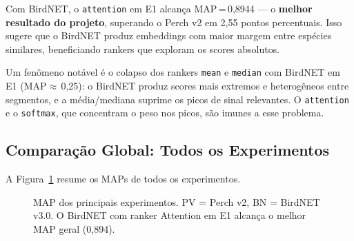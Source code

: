 \documentclass[12pt,a4paper]{article}
\begin{document}
Com BirdNET, o \texttt{attention} em E1 alcança MAP\,=\,0,8944 --- o
\textbf{melhor resultado do projeto}, superando o Perch v2 em 2,55 pontos
percentuais. Isso sugere que o BirdNET produz embeddings com maior margem
entre espécies similares, beneficiando rankers que exploram os scores absolutos.

Um fenômeno notável é o colapso dos rankers \texttt{mean} e \texttt{median} com
BirdNET em E1 (MAP$\approx$\,0,25): o BirdNET produz scores mais extremos e
heterogêneos entre segmentos, e a média/mediana suprime os picos de sinal
relevantes. O \texttt{attention} e o \texttt{softmax}, que concentram o peso nos
picos, são imunes a esse problema.

\subsection{Comparação Global: Todos os Experimentos}

A Figura~\ref{fig:map_comparison} resume os MAPs de todos os experimentos.

\begin{figure}[htbp]
\centering
{}
\caption{MAP dos principais experimentos. PV = Perch v2, BN = BirdNET v3.0.
O BirdNET com ranker Attention em E1 alcança o melhor MAP geral (0,894).}
\label{fig:map_comparison}
\end{figure}
\end{document}
